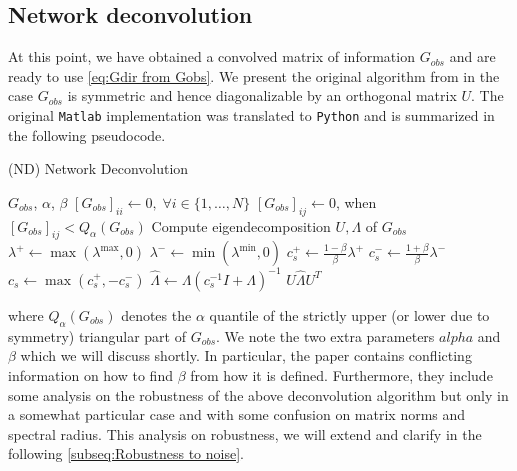 \documentclass[../Thesis.tex]{subfiles}
\begin{document}
\subsection{Network deconvolution}
At this point, we have obtained a convolved matrix of information $G_{obs}$ and are ready to use \autoref{eq:Gdir from Gobs}. We present the original algorithm from \cite{Network-deconvolution-as-a-general-method-to-distinguish-direct-dependencies-in-networks} in the case $G_{obs}$ is symmetric and hence diagonalizable by an orthogonal matrix $U$. The original \texttt{Matlab} implementation was translated to \texttt{Python} and is summarized in the following pseudocode.
\begin{algorithm}[H]
    \caption{(ND) Network Deconvolution}\label{alg:ND}
    \begin{algorithmic}
        \Require $G_{obs}$, $\alpha$, $\beta$             %
        \State $\left[G_{obs}\right]_{ii} \gets 0, \; \forall i\in \{1,\dots, N\}$                    
        \State $\left[G_{obs}\right]_{ij} \gets 0$, when $\left[G_{obs}\right]_{ij} < Q_{\alpha}\left(G_{obs}\right)$
        \State Compute eigendecomposition $U,\Lambda$ of $G_{obs}$
        \State $\lambda^+ \gets  \max{ \left( \lambda^{\text{max}},0 \right) }$
        \State $\lambda^- \gets \min{ \left( \lambda^{\text{min}},0 \right) }$
        \State $c_s^+ \gets \frac{1-\beta}{\beta} \lambda^+$
        \State $c_s^- \gets \frac{1+\beta}{\beta} \lambda^-$
        \State $c_s \gets \max{\left( c_s^+, - c_s^- \right)}$
        \State $\hat{\Lambda} \gets \Lambda \left(c_s^{-1}I + \Lambda\right)^{-1}$
        \State \Return $U \hat{\Lambda} U^T$
    \end{algorithmic}
\end{algorithm}
where $Q_{\alpha} \left(G_{obs}\right)$ denotes the $\alpha$ quantile of the strictly upper (or lower due to symmetry) triangular part of $G_{obs}$. We note the two extra parameters $alpha$ and $\beta$ which we will discuss shortly. In particular, the paper contains conflicting information on how to find $\beta$ from how it is defined. Furthermore, they include some analysis on the robustness of the above deconvolution algorithm but only in a somewhat particular case and with some confusion on matrix norms and spectral radius. This analysis on robustness, we will extend and clarify in the following \autoref{subseq:Robustness to noise}.
\end{document}
